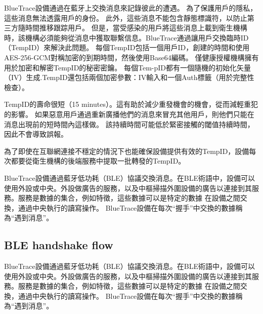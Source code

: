 \documentclass[12pt, a4paper]{report}
\begin{document}
BlueTrace設備通過在藍牙上交換消息來記錄彼此的遭遇。 為了保護用戶的隱私，這些消息無法透露用戶的身份。 此外，這些消息不能包含靜態標識符，以防止第三方隨時間推移跟踪用戶。 但是，當受感染的用戶將這些消息上載到衛生機構時，該機構必須能夠從消息中獲取聯繫信息。BlueTrace通過讓用戶交換臨時ID（TempID）來解決此問題。 每個TempID包括一個用戶ID，創建的時間和使用AES-256-GCM對稱加密的到期時間，然後使用Base64編碼。 僅健康授權機構擁有用於加密和解密TempID的秘密密鑰。 每個Tem-pID都有一個隨機的初始化矢量（IV）生成.TempID還包括兩個加密參數：IV輸入和一個Auth標籤（用於完整性檢查）。

TempID的壽命很短（15 minutes）。這有助於減少重發機會的機會，從而減輕重犯的影響。 如果惡意用戶通過重新廣播他們的消息來冒充其他用戶，則他們只能在消息出現前的短時間內這樣做。 該持續時間可能低於緊密接觸的閾值持續時間，因此不會導致誤報。

為了即使在互聯網連接不穩定的情況下也能確保設備提供有效的TempID，設備每次都要從衛生機構的後端服務中提取一批轉發的TempID。

BlueTrace設備通過藍牙低功耗（BLE）協議交換消息。在BLE術語中，設備可以使用外設或中央。外設做廣告的服務，以及中樞掃描外圍設備的廣告以連接到其服務。服務是數據的集合，例如特徵，這些數據可以是特定的數據 在設備之間交換，通過中央執行的讀寫操作。 BlueTrace設備在每次“握手”中交換的數據稱為“遇到消息”。

\subsection{BLE handshake flow}

\begin{figure}[H] %
    \centering %
\end{figure}

BlueTrace設備通過藍牙低功耗（BLE）協議交換消息。在BLE術語中，設備可以使用外設或中央。外設做廣告的服務，以及中樞掃描外圍設備的廣告以連接到其服務。服務是數據的集合，例如特徵，這些數據可以是特定的數據 在設備之間交換，通過中央執行的讀寫操作。 BlueTrace設備在每次“握手”中交換的數據稱為“遇到消息”。
\end{document}
